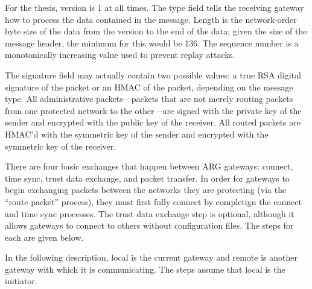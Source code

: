 \par For the thesis, version is 1 at all times. The type field tells the receiving gateway how to process the data contained in the message.  Length is the network-order byte size of the data from the version to the end of the data; given the size of the message header, the minimum for this would be 136. The sequence number is a monotonically increasing value used to prevent replay attacks.

\par The signature field may actually contain two possible values: a true \ac{RSA} digital signature of the packet or an \ac{HMAC} of the packet, depending on the message type. All administrative packets---packets that are not merely routing packets from one protected network to the other---are signed with the private key of the sender and encrypted with the public key of the receiver. All routed packets are \ac{HMAC}'d with the symmetric key of the sender and encrypted with the symmetric key of the receiver.

\par There are four basic exchanges that happen between \ac{ARG} gateways: connect, time sync, trust data exchange, and packet transfer. In order for gateways to begin exchanging packets between the networks they are protecting (via the ``route packet'' process), they must first fully connect by completign the connect and time sync processes. The trust data exchange step is optional, although it allows gateways to connect to others without configuration files. The steps for each are given below.

\par In the following description, local is the current gateway and remote is another gateway with which it is communicating. The steps assume that local is the initiator.

